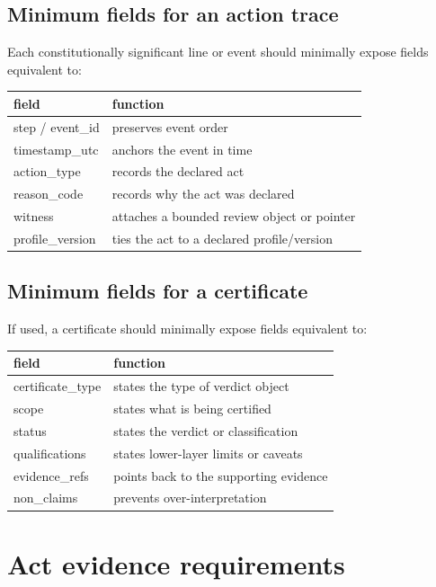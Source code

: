 \documentclass[11pt]{article}
\begin{document}
\subsection{Minimum fields for an action trace}

Each constitutionally significant line or event should minimally expose fields equivalent to:

\begin{center}
\begin{tabular}{>{\ttfamily}p{4cm} p{9cm}}
\toprule
field & function \\
\midrule
step / event\_id & preserves event order \\
timestamp\_utc & anchors the event in time \\
action\_type & records the declared act \\
reason\_code & records why the act was declared \\
witness & attaches a bounded review object or pointer \\
profile\_version & ties the act to a declared profile/version \\
\bottomrule
\end{tabular}
\end{center}

\subsection{Minimum fields for a certificate}

If used, a certificate should minimally expose fields equivalent to:

\begin{center}
\begin{tabular}{>{\ttfamily}p{4cm} p{9cm}}
\toprule
field & function \\
\midrule
certificate\_type & states the type of verdict object \\
scope & states what is being certified \\
status & states the verdict or classification \\
qualifications & states lower-layer limits or caveats \\
evidence\_refs & points back to the supporting evidence \\
non\_claims & prevents over-interpretation \\
\bottomrule
\end{tabular}
\end{center}

\section{Act evidence requirements}
\end{document}
